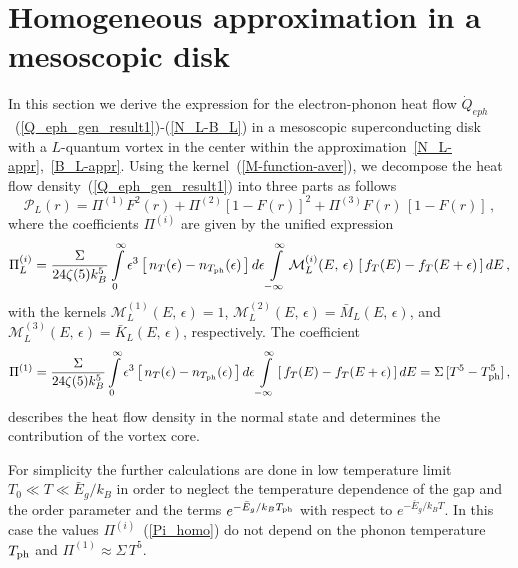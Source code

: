 \documentclass[prx,twocolumn,aps,superscriptaddress,showpacs,amsmath,amssymb,footnoteinbib]{revtex4-1}
\begin{document}
\section{Homogeneous approximation in a mesoscopic disk}
\label{Append}
%
In this section we derive the expression for the
electron-phonon heat flow $\dot Q_{eph}$~(\ref{Q_eph_gen_result1})-(\ref{N_L-B_L}) in a mesoscopic
superconducting disk with a $L$-quantum vortex in the center within the approximation~\eqref{N_L-appr},~\eqref{B_L-appr}.
Using the kernel~(\ref{M-function-aver}), we decompose the heat flow density~(\ref{Q_eph_gen_result1}) into three parts as follows
%
\begin{equation}\label{PL_homo}
    \mathcal{P}_L(r) = \Pi^{(1)} F^2(r) + \Pi^{(2)} [1 - F(r)]^2 + \Pi^{(3)} F(r)\,[1 - F(r)] \,,
\end{equation}
%
where the coefficients $\Pi^{(i)}$ are given by the unified expression
%
\begin{equation}
   \Pi_L^{(i)} = \frac{\Sigma}{24 \zeta(5) k_B^5} \int\limits_{0}^{\infty}\epsilon^3 \left[\, n_T(\epsilon)
            - n_{T_{\rm ph}}(\epsilon)\, \right] d\epsilon \int\limits_{-\infty}^{\infty}
             \mathcal{M}_L^{(i)}(E,\,\epsilon)\,\left[\, f_T(E) - f_T(E+\epsilon)\,\right] dE \,, \label{Pi_homo}
\end{equation}
%
with the kernels $\mathcal{M}_L^{(1)}(E,\,\epsilon) =  1$,
$\mathcal{M}_L^{(2)}(E,\,\epsilon) = \bar{M}_L(E,\,\epsilon)$, and
$\mathcal{M}_L^{(3)}(E,\,\epsilon) = \bar{K}_L(E,\,\epsilon)$, respectively.
The coefficient
%
\begin{equation}
   \Pi^{(1)} = \frac{\Sigma}{24 \zeta(5) k_B^5} \int\limits_{0}^{\infty}\epsilon^3 \left[\, n_T(\epsilon)
            - n_{T_{\rm ph}}(\epsilon)\, \right] d\epsilon \int\limits_{-\infty}^{\infty}
             \left[\, f_T(E) - f_T(E+\epsilon)\,\right] dE = \Sigma\, [ T^5 - T_{\rm ph}^5] \,, \label{Pi1_homo}
\end{equation}
%
describes the heat flow density in the normal state and determines
the contribution of the vortex core.

For simplicity the further calculations are done in low temperature limit $T_0 \ll T\ll
\bar{E}_g/k_B$ in order to neglect the temperature dependence of the gap
and the order parameter and the terms $e^{-\bar{E}_g/k_B T_{\rm ph}}$
with respect to $e^{-\bar{E}_g/k_B T}$.
In this case the values
$\Pi^{(i)}$~(\ref{Pi_homo}) do not depend on the phonon temperature
$T_{\rm ph}$ and  $\Pi^{(1)} \approx \Sigma\, T^5$.
\end{document}
